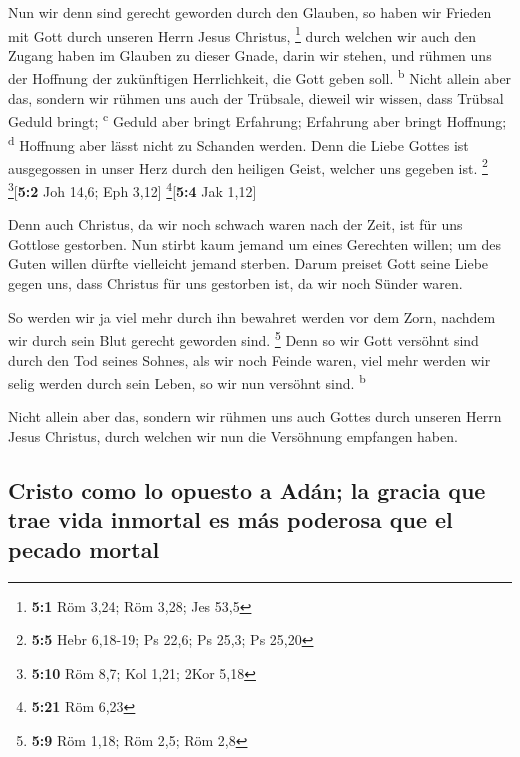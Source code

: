  Nun wir denn sind gerecht geworden durch den Glauben, so
haben wir Frieden mit Gott durch unseren Herrn Jesus Christus,
\footnote{\textbf{5:1} Röm 3,24; Röm 3,28; Jes 53,5} 
durch welchen wir auch den Zugang haben im Glauben zu dieser Gnade,
darin wir stehen, und rühmen uns der Hoffnung der zukünftigen
Herrlichkeit, die Gott geben soll. \textsuperscript{b} 
Nicht allein aber das, sondern wir rühmen uns auch der Trübsale, dieweil
wir wissen, dass Trübsal Geduld bringt; \textsuperscript{c}
 Geduld aber bringt Erfahrung; Erfahrung aber bringt
Hoffnung; \textsuperscript{d}  Hoffnung aber lässt nicht
zu Schanden werden. Denn die Liebe Gottes ist ausgegossen in unser Herz
durch den heiligen Geist, welcher uns gegeben ist. \footnote{\textbf{5:5}
  Hebr 6,18-19; Ps 22,6; Ps 25,3; Ps 25,20} \footnote{\textbf{5:10} Röm
  8,7; Kol 1,21; 2Kor 5,18}{[}\textbf{5:2} Joh 14,6; Eph 3,12{]}
\footnote{\textbf{5:21} Röm 6,23}{[}\textbf{5:4} Jak 1,12{]}

 Denn auch Christus, da wir noch schwach waren nach der
Zeit, ist für uns Gottlose gestorben.  Nun stirbt kaum
jemand um eines Gerechten willen; um des Guten willen dürfte vielleicht
jemand sterben.  Darum preiset Gott seine Liebe gegen uns,
dass Christus für uns gestorben ist, da wir noch Sünder waren.

 So werden wir ja viel mehr durch ihn bewahret werden vor
dem Zorn, nachdem wir durch sein Blut gerecht geworden sind. \footnote{\textbf{5:9}
  Röm 1,18; Röm 2,5; Röm 2,8}  Denn so wir Gott versöhnt
sind durch den Tod seines Sohnes, als wir noch Feinde waren, viel mehr
werden wir selig werden durch sein Leben, so wir nun versöhnt sind.
\textsuperscript{b}

 Nicht allein aber das, sondern wir rühmen uns auch
Gottes durch unseren Herrn Jesus Christus, durch welchen wir nun die
Versöhnung empfangen haben.

\hypertarget{cristo-como-lo-opuesto-a-aduxe1n-la-gracia-que-trae-vida-inmortal-es-muxe1s-poderosa-que-el-pecado-mortal}{%
\subsection{Cristo como lo opuesto a Adán; la gracia que trae vida
inmortal es más poderosa que el pecado
mortal}\label{cristo-como-lo-opuesto-a-aduxe1n-la-gracia-que-trae-vida-inmortal-es-muxe1s-poderosa-que-el-pecado-mortal}}

